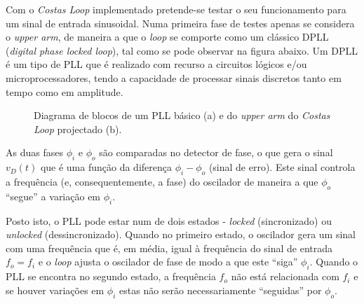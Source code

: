 \documentclass[11pt]{article}
\numberwithin{equation}{section}
\begin{document}

Com o \textit{Costas Loop} implementado pretende-se testar o seu funcionamento para um sinal de entrada sinusoidal. Numa primeira fase de testes apenas se considera o \textit{upper arm}, de maneira a que o \textit{loop} se comporte como um clássico DPLL (\textit{digital phase locked loop}), tal como se pode observar na figura abaixo. Um DPLL é um tipo de PLL que é realizado com recurso a circuitos lógicos e/ou microprocessadores, tendo a capacidade de processar sinais discretos tanto em tempo como em amplitude.

\begin{figure}[H]
	\centering
	\hspace{8mm}
	\vspace{-0.8em}
	\caption{Diagrama de blocos de um PLL básico (a) e do \textit{upper arm} do \textit{Costas Loop} projectado (b).}
	\vspace{-0.8em}
\end{figure}

As duas fases $\phi_{i}$ e $\phi_{o}$ são comparadas no detector de fase, o que gera o sinal $v_{D}\left(t\right)$ que é uma função da diferença $\phi_{i} - \phi_{o}$ (sinal de erro). Este sinal controla a frequência (e, consequentemente, a fase) do oscilador de maneira a que $\phi_{o}$ ``segue'' a variação em $\phi_{i}$.

Posto isto, o PLL pode estar num de dois estados - \textit{locked} (sincronizado) ou \textit{unlocked} (dessincronizado). Quando no primeiro estado, o oscilador gera um sinal com uma frequência que é, em média, igual à frequência do sinal de entrada $f_o = f_i$ e o \textit{loop} ajusta o oscilador de fase de modo a que este ``siga'' $\phi_{i}$. Quando o PLL se encontra no segundo estado, a frequência $f_o$ não está relacionada com $f_i$ e se houver variações em $\phi_{i}$ estas não serão necessariamente ``seguidas'' por $\phi_{o}$.
\end{document}
